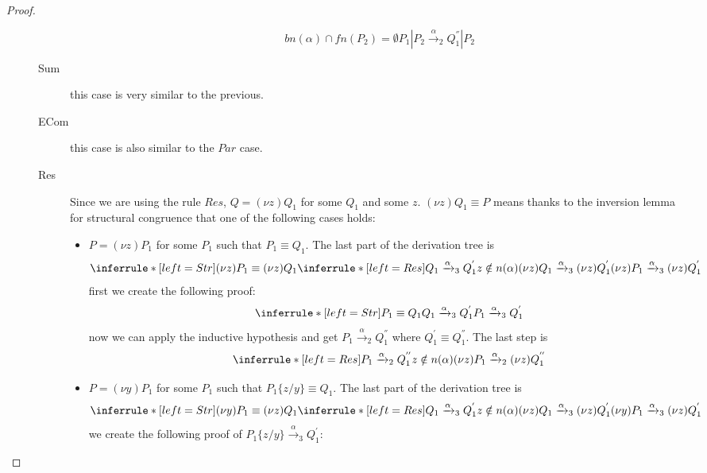 \begin{theorem}
\begin{proof}
\begin{description}
\begin{description}
\[{			  bn(\alpha)\cap fn(P_{2})=\emptyset
		      }{
			P_{1}|P_{2}\xrightarrow{\alpha}_{2}Q_{1}^{''}|P_{2}
		      }
		    \]
		  \item[Sum] this case is very similar to the previous.
		  \item[ECom] this case is also similar to the $Par$ case.
		  \item[Res]
		    Since we are using the rule $Res$, $Q=(\nu z)Q_{1}$ for some $Q_{1}$ and some $z$. $(\nu z)Q_{1}\equiv P$ means thanks to the inversion lemma for structural congruence that one of the following cases holds:
                    \begin{itemize}
		      \item
			$P=(\nu z)P_{1}$ for some $P_{1}$ such that $P_{1}\equiv Q_{1}$. The last part of the derivation tree is 
			\[
			  \inferrule* [left=Str]{
			      (\nu z)P_{1}\equiv (\nu z)Q_{1}
			    \\
			      \inferrule* [left=Res]{
				  Q_{1}\xrightarrow{\alpha}_{3}Q_{1}^{'}
				\\
				  z\notin n(\alpha)
			      }{
				(\nu z)Q_{1}\xrightarrow{\alpha}_{3}(\nu z)Q_{1}^{'}
			      }
			  }{
			    (\nu z)P_{1}\xrightarrow{\alpha}_{3}(\nu z)Q_{1}^{'}
			  }
			\]
			first we create the following proof:
			\[
			      \inferrule* [left=Str]{
				  P_{1}\equiv Q_{1}
				\\
				  Q_{1}
				    \xrightarrow{\alpha}_{3}
				      Q_{1}^{'}
			      }{
				P_{1}\xrightarrow{\alpha}_{3}Q_{1}^{'}
			      }
			\]
			now we can apply the inductive hypothesis and get $P_{1}\xrightarrow{\alpha}_{2}Q_{1}^{''}$ where $Q_{1}^{'}\equiv Q_{1}^{''}$. The last step is 
			\[
			  \inferrule* [left=Res]{
			      P_{1}\xrightarrow{\alpha}_{2}Q_{1}^{''}
			    \\
			      z\notin n(\alpha)
			  }{
			    (\nu z)P_{1}\xrightarrow{\alpha}_{2}(\nu z)Q_{1}^{''}
			  }
			\]
		      \item
			$P=(\nu y)P_{1}$ for some $P_{1}$ such that $P_{1}\{z/y\}\equiv Q_{1}$. The last part of the derivation tree is 
			\[
			  \inferrule* [left=Str]{
			      (\nu y)P_{1}\equiv (\nu z)Q_{1}
			    \\
			      \inferrule* [left=Res]{
				  Q_{1}\xrightarrow{\alpha}_{3}Q_{1}^{'}
				\\
				  z\notin n(\alpha)
			      }{
				(\nu z)Q_{1}\xrightarrow{\alpha}_{3}(\nu z)Q_{1}^{'}
			      }
			  }{
			    (\nu y)P_{1}\xrightarrow{\alpha}_{3}(\nu z)Q_{1}^{'}
			  }
			\]
			we create the following proof of $P_{1}\{z/y\}\xrightarrow{\alpha}_{3}Q_{1}^{'}$:

\end{itemize}
\end{description}
\end{description}
\end{proof}
\end{theorem}
